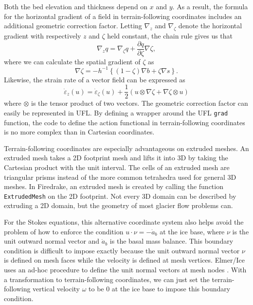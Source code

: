 \documentclass{article}
\theoremstyle{definition}
\theoremstyle{plain}
\begin{document}
Both the bed elevation and thickness depend on $x$ and $y$.
As a result, the formula for the horizontal gradient of a field in terrain-following coordinates includes an additional geometric correction factor.
Letting $\nabla_z$ and $\nabla_\zeta$ denote the horizontal gradient with respectively $z$ and $\zeta$ held constant, the chain rule gives us that
\begin{equation}
    \nabla_zq = \nabla_\zeta q + \frac{\partial q}{\partial\zeta}\nabla\zeta,
\end{equation}
where we can calculate the spatial gradient of $\zeta$ as
\begin{equation}
    \nabla\zeta = -h^{-1}\left\{(1 - \zeta)\nabla b + \zeta\nabla s\right\}.
\end{equation}
Likewise, the strain rate of a vector field can be expressed as
\begin{equation}
    \dot\varepsilon_z(u) = \dot\varepsilon_\zeta(u) + \frac{1}{2}\left(u \otimes\nabla\zeta + \nabla\zeta\otimes u\right)
\end{equation}
where $\otimes$ is the tensor product of two vectors.
The geometric correction factor can easily be represented in UFL.
By defining a wrapper around the UFL \texttt{grad} function, the code to define the action functional in terrain-following coordinates is no more complex than in Cartesian coordinates.

Terrain-following coordinates are especially advantageous on extruded meshes.
An extruded mesh takes a 2D footprint mesh and lifts it into 3D by taking the Cartesian product with the unit interval.
The cells of an extruded mesh are triangular prisms instead of the more common tetrahedra used for general 3D meshes.
In Firedrake, an extruded mesh is created by calling the function \texttt{ExtrudedMesh} on the 2D footprint.
Not every 3D domain can be described by extruding a 2D domain, but the geometry of most glacier flow problems can.

For the Stokes equations, this alternative coordinate system also helps avoid the problem of how to enforce the condition $u\cdot \nu = -\dot a_b$ at the ice base, where $\nu$ is the unit outward normal vector and $\dot a_b$ is the basal mass balance.
This boundary condition is difficult to impose exactly because the unit outward normal vector $\nu$ is defined on mesh faces while the velocity is defined at mesh vertices.
Elmer/Ice uses an ad-hoc procedure to define the unit normal vectors at mesh nodes \citep{gagliardini2013capabilities}.
With a transformation to terrain-following coordinates, we can just set the terrain-following vertical velocity $\omega$ to be 0 at the ice base to impose this boundary condition.
\end{document}
